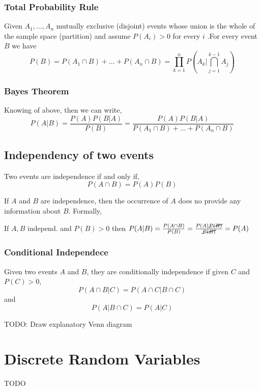 \subsubsection{Total Probability Rule}
Given $A_1,\dots,A_n$ mutually exclusive (disjoint) events whose union is the whole of the sample space (partition) and assume $P(A_i) > 0$ for every $i$ .For every 
event $B$ we have
\[ P(B) = P(A_1\cap B) + \dots + P(A_n \cap B) = \prod_{k=1}^{n}P(A_k|\bigcap_{j=1}^{k-1}A_j)\]

\subsubsection{Bayes Theorem}
Knowing of above, then we can write,
\[ P(A|B) = \frac{P(A)P(B|A)}{P(B)} =  \frac{P(A)P(B|A)}{P(A_1\cap B) + \dots + P(A_n \cap B)}\]

\subsection{Independency of two events}
Two events are independence if and only if,
\[ P(A\cap B) = P(A)P(B)\]

If $A$ and $B$ are independence, then the occurrence of $A$ does no provide any information about $B$. Formally,
\begin{center}
    If $A, B$ independ. and $P(B)>0$ then $P(A|B) = \frac{P(A\cap B)}{P(B)} = \frac{P(A)\cancel{P(B)}}{\cancel{P(B)}} = P(A)$
\end{center}

\subsubsection{Conditional Independece}
Given two events $A$ and $B$, they are conditionally independence if given $C$ and $P(C)>0$, 
\[ P(A\cap B|C) = P(A\cap C|B\cap C) \]
and
\[ P(A|B\cap C) = P(A|C)\]

TODO: Draw explanatory Venn diagram 

\section{Discrete Random Variables}
TODO